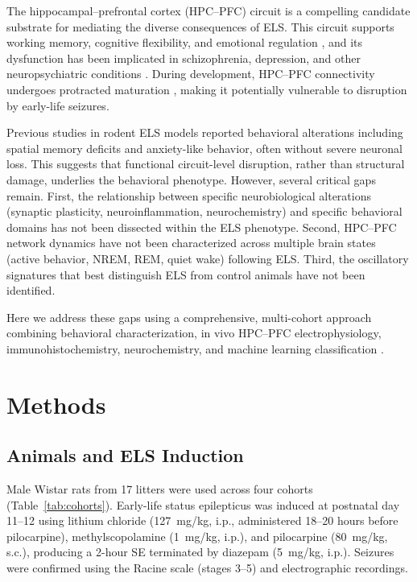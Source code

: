 \documentclass[11pt]{article}
\begin{document}
The hippocampal--prefrontal cortex (HPC--PFC) circuit is a compelling candidate substrate for mediating the diverse consequences of ELS. This circuit supports working memory, cognitive flexibility, and emotional regulation \citep{sigurdsson2010impaired, thierry2000hippocampo}, and its dysfunction has been implicated in schizophrenia, depression, and other neuropsychiatric conditions \citep{winterer2004prefrontal}. During development, HPC--PFC connectivity undergoes protracted maturation \citep{jones2008maturation}, making it potentially vulnerable to disruption by early-life seizures.

Previous studies in rodent ELS models reported behavioral alterations including spatial memory deficits and anxiety-like behavior, often without severe neuronal loss. This suggests that functional circuit-level disruption, rather than structural damage, underlies the behavioral phenotype. However, several critical gaps remain. First, the relationship between specific neurobiological alterations (synaptic plasticity, neuroinflammation, neurochemistry) and specific behavioral domains has not been dissected within the ELS phenotype. Second, HPC--PFC network dynamics have not been characterized across multiple brain states (active behavior, NREM, REM, quiet wake) following ELS. Third, the oscillatory signatures that best distinguish ELS from control animals have not been identified.

Here we address these gaps using a comprehensive, multi-cohort approach combining behavioral characterization, in vivo HPC--PFC electrophysiology, immunohistochemistry, neurochemistry, and machine learning classification \citep{cortes1995support}.

\section{Methods}

\subsection{Animals and ELS Induction}

Male Wistar rats from 17 litters were used across four cohorts (Table~\ref{tab:cohorts}). Early-life status epilepticus was induced at postnatal day 11--12 using lithium chloride (127~mg/kg, i.p., administered 18--20 hours before pilocarpine), methylscopolamine (1~mg/kg, i.p.), and pilocarpine (80~mg/kg, s.c.), producing a 2-hour SE terminated by diazepam (5~mg/kg, i.p.). Seizures were confirmed using the Racine scale (stages 3--5) and electrographic recordings.
\end{document}
